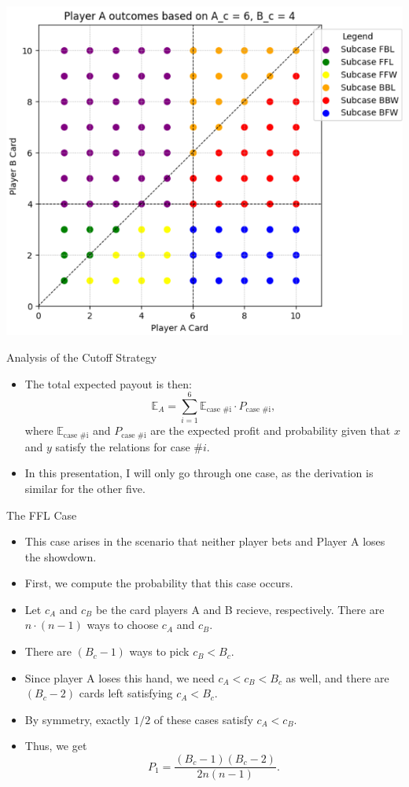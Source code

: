 \documentclass[aspectratio=169]{beamer}
\begin{document}
\begin{frame}{}
    \includegraphics[scale=0.6]{DiscreteCutoffs.png}
\end{frame}
\begin{frame}{Analysis of the Cutoff Strategy}
\begin{itemize}
\item The total expected payout is then: $$\mathbb{E}_A = \sum_{i=1}^{6}\mathbb{E}_{\text{case \#i}} \cdot P_{\text{case \#i}},$$
where $\mathbb{E}_\text{case \#i}$ and $P_{\text{case \#i}}$ are the expected profit and probability given that $x$ and $y$ satisfy the relations for case $\#i.$
\item In this presentation, I will only go through one case, as the derivation is similar for the other five.
\end{itemize}
\end{frame}
\begin{frame}{The FFL Case}
\begin{itemize}
\item  This case arises in the scenario that neither player bets and Player A loses the showdown. \pause
\item  First, we compute the probability that this case occurs. \pause
    \item Let $c_A$ and $c_B$ be the card players A and B recieve, respectively. There are $n \cdot (n-1)$ ways to choose $c_A$ and $c_B.$ \pause
    \item There are $(B_c-1)$ ways to pick $c_B < B_c$. \pause
    \item Since player A loses this hand, we need $c_A < c_B < B_c$ as well, and there are $(B_c-2)$ cards left satisfying $c_A < B_c.$ \pause
    \item By symmetry, exactly $1/2$ of these cases satisfy $c_A < c_B.$ \pause
    \item Thus, we get $$P_{1} = \frac{(B_c-1)(B_c-2)}{2n(n-1)}.$$ 
\end{itemize}
\end{frame}
\end{document}
